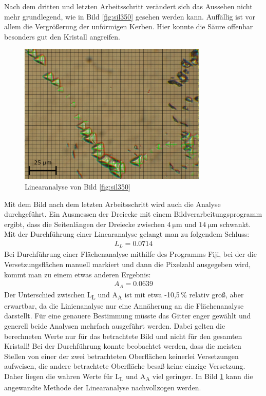 \documentclass[german, %
parskip=full, %
bibliography=totoc, %
]{scrartcl}
\begin{document}
Nach dem dritten und letzten Arbeitsschritt verändert sich das Aussehen nicht mehr grundlegend, wie in Bild \ref{fig:sil350} gesehen werden kann. Auffällig ist vor allem die Vergrößerung der unförmigen Kerben. Hier konnte die Säure offenbar besonders gut den Kristall angreifen.

\begin{figure}[ht] 
  \centering
     \includegraphics[width=0.8\textwidth]{Silicium_3_50_mal2}
  \caption{Linearanalyse von Bild \ref{fig:sil350}}
  \label{fig:linana}
\end{figure}

Mit dem Bild nach dem letzten Arbeitsschritt wird auch die Analyse durchgeführt. Ein Ausmessen der Dreiecke mit einem Bildverarbeitungsprogramm ergibt, dass die Seitenlängen der Dreiecke zwischen \(\SI{4}{\micro\meter}\) und \(\SI{14}{\micro\meter}\) schwankt. Mit der Durchführung einer Linearanalyse gelangt man zu folgendem Schluss:
\begin{align*}
L_L = 0.0714
\end{align*}
Bei Durchführung einer Flächenanalyse mithilfe des Programms Fiji, bei der die Versetzungsflächen manuell markiert und dann die Pixelzahl ausgegeben wird, kommt man zu einem etwas anderen Ergebnis:
\begin{align*}
A_A = 0.0639
\end{align*}
Der Unterschied zwischen L\textsubscript{L} und A\textsubscript{A} ist mit etwa -10,5\,\% relativ groß, aber erwartbar, da die Linienanalyse nur eine Annäherung an die Flächenanalyse darstellt. Für eine genauere Bestimmung müsste das Gitter enger gewählt und generell beide Analysen mehrfach ausgeführt werden. Dabei gelten die berechneten Werte nur für das betrachtete Bild und nicht für den gesamten Kristall! Bei der Durchführung konnte beobachtet werden, dass die meisten Stellen von einer der zwei betrachteten Oberflächen keinerlei Versetzungen aufweisen, die andere betrachtete Oberfläche besaß keine einzige Versetzung. Daher liegen die wahren Werte für L\textsubscript{L} und A\textsubscript{A} viel geringer. In Bild \ref{fig:linana} kann die angewandte Methode der Linearanalyse nachvollzogen werden.
\end{document}
